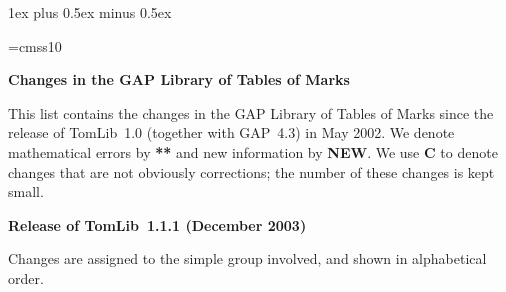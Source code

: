 
\parskip 1ex plus 0.5ex minus 0.5ex
\parindent0pt

\font\sf=cmss10
\def\CAS{{\sf CAS}}
\def\GAP{{\sf GAP}}
\def\MOC{{\sf MOC}}

\def\contrib#1{}

\def\tthdump#1{#1}

\tthdump{\centerline{\bf Changes in the {\GAP} Library of Tables of Marks}}

\bigbreak


This list contains the changes in the {\GAP} Library of Tables of Marks
since the release of TomLib~1.0 (together with {\GAP}~4.3) in May 2002.
We denote mathematical errors by {\bf ***} and new information
by {\bf NEW}\null.
We use {\bf C} to denote changes that are not obviously corrections;
the number of these changes is kept small.

\bigbreak

{\bf Release of TomLib~1.1.1 (December 2003)}

\bigbreak

Changes are assigned to the simple group involved,
and shown in alphabetical order.

\medbreak




